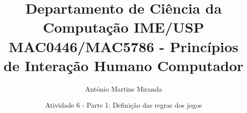 \documentclass[a4paper,11pt]{article}
\begin{document}
\small{
\title{                                                                                                                                                                                             
{\small                                                                                                                                                                                             
Departamento de Ciência da Computação \hfill IME/USP}\\\vspace{0.1in}                                                                                                                               
MAC0446/MAC5786 - Princípios de Interação Humano Computador
}

\vspace{-0.6in} 
\author{António Martins Miranda}
\vspace{-0.6in}

\date{Atividade 6 - Parte 1: Definição das regras dos jogos}
\maketitle
}
 
\vspace {-0.3in}
\thispagestyle{empty}
\end{document}

